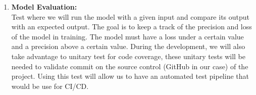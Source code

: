 \begin{enumerate}
\item \textbf{Model Evaluation:} \\
Test where we will run the model with a given input and compare its output with an expected output. The goal is to keep a track of the precision and loss of the model in training. The model must have a loss under a certain value and a precision above a certain value. During the development, we will also take advantage to unitary test for code coverage, these unitary tests will be needed to validate commit on the source control (GitHub in our case) of the project. Using this test will allow us to have an automated test pipeline that would be use for CI/CD. 

%
%    
%
%    


\end{enumerate}
